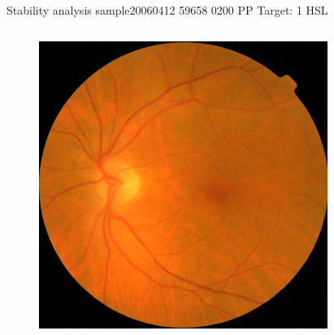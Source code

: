 \documentclass{beamer}
\begin{document}
\begin{frame}{Stability analysis sample}{20060412 59658 0200 PP Target: 1 HSL}
\begin{columns}
	\begin{column}{0.3\textwidth}
		\begin{figure}[p]
			\centering
			\includegraphics[width=\textwidth]{chapter_stability/20060412_59658_0200_PP/20060412_59658_0200_PP.jpeg}
		\end{figure}	
	\end{column}
	\begin{column}{0.45\textwidth}  %
		\begin{figure}[p]
			\centering

\end{figure}
\end{column}
\end{columns}
\end{frame}
\end{document}
